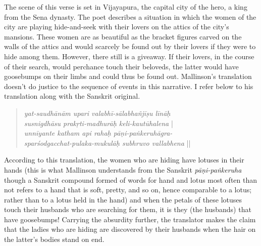 The scene of this verse is set in Vijayapura, the capital city of the hero, a king from the Sena dynasty. The poet describes a situation in which the women of the city are playing hide-and-seek with their lovers on the attics of the city's mansions. These women are as beautiful as the bracket figures carved on the walls of the attics and would scarcely be found out by their lovers if they were to hide among them. However, there still is a giveaway. If their lovers, in the course of their search, would perchance touch their beloveds, the latter would have goosebumps on their limbs and could thus be found out. Mallinson's translation doesn't do justice to the sequence of events in this narrative. I refer below to his translation along with the Sanskrit original.
\begin{quote}
\textsl{yat-saudhānām upari valabhī-sālabhañjīṣu līnāḥ}\\
\textsl{susnigdhāsu prakṛti-madhurāḥ keli-kautūhalena} |\\
\textsl{unnīyante katham api rahaḥ pāṇi-paṅkeruhāgra-}\\
\textsl{sparśodgacchat-pulaka-mukulāḥ subhruvo vallabhena} ||
\end{quote}



According to this translation, the women who are hiding have lotuses in their hands (this is what Mallinson understands from the Sanskrit \textsl{pāṇi-paṅkeruha} though a Sanskrit compound formed of words for hand and lotus most often than not refers to a hand that is soft, pretty, and so on, hence comparable to a lotus; rather than to a lotus held in the hand) and when the petals of these lotuses touch their husbands who are searching for them, it is they (the husbands) that have goosebumps! Carrying the absurdity further, the translator makes the claim that the ladies who are hiding are discovered by their husbands when the hair on the latter's bodies stand on end.

